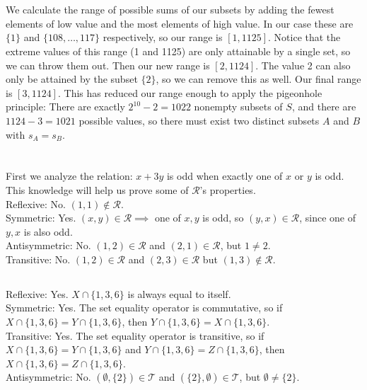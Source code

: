 \documentclass{article}
\begin{document}
\section{} %
We calculate the range of possible sums of our subsets by adding the fewest
elements of low value and the most elements of high value. In our case these
are $\{1\}$ and $\{108,\ldots,117\}$ respectively, so our range is $[1,1125]$.
Notice that the extreme values of this range (1 and 1125) are only attainable by
a single set, so we can throw them out. Then our new range is $[2,1124]$. The
value 2 can also only be attained by the subset $\{2\}$, so we can remove this
as well. Our final range is $[3,1124]$. This has reduced our range enough to
apply the pigeonhole principle: There are exactly $2^10-2=1022$ nonempty subsets
of $S$, and there are $1124-3=1021$ possible values, so there must exist two
distinct subsets $A$ and $B$ with $s_A=s_B$.

\section{} %
\subsection{} %
First we analyze the relation: $x+3y$ is odd when exactly one of $x$ or $y$ is
odd. This knowledge will help us prove some of $\mathcal R$'s properties.\\
Reflexive: No. $(1,1)\not\in\mathcal R$.\\
Symmetric: Yes. $(x,y)\in\mathcal R \implies$ one of $x,y$ is odd, so
$(y,x)\in\mathcal R$, since one of $y,x$ is also odd.\\
Antisymmetric: No. $(1,2)\in\mathcal R$ and $(2,1)\in\mathcal R$, but $1\neq2$.\\
Transitive: No. $(1,2)\in\mathcal R$ and $(2,3)\in\mathcal R$ but
$(1,3)\not\in\mathcal R$.

\subsection{} %
Reflexive: Yes. $X\cap\{1,3,6\}$ is always equal to itself.\\
Symmetric: Yes. The set equality operator is commutative, so if
$X\cap\{1,3,6\}=Y\cap\{1,3,6\}$, then $Y\cap\{1,3,6\}=X\cap\{1,3,6\}$.\\
Transitive: Yes. The set equality operator is transitive, so if
$X\cap\{1,3,6\}=Y\cap\{1,3,6\}$ and $Y\cap\{1,3,6\}=Z\cap\{1,3,6\}$, then
$X\cap\{1,3,6\}=Z\cap\{1,3,6\}$.\\
Antisymmetric: No. $(\emptyset,\{2\})\in\mathcal T$ and $(\{2\},\emptyset)\in\mathcal T$,
but $\emptyset\neq\{2\}$.
\end{document}
